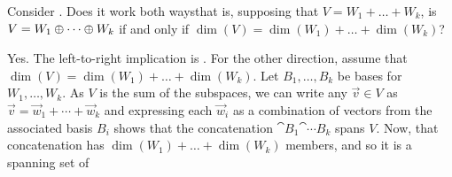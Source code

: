 \begin{exercises}
  \recommended \item 
    Consider .
    Does it work both ways\Dash that is,
    supposing that \( V=W_1+\dots+ W_k \),
    is \( V=W_1\oplus\cdots\oplus W_k \) if and only if
    \( \dim(V)=\dim(W_1)+\dots+\dim(W_k) \)?
    \begin{answer}
      Yes.
      The left-to-right implication is
      .
      For the other direction,
      assume that \( \dim(V)=\dim(W_1)+\dots+\dim(W_k) \).
      Let \( B_1,\dots, B_k \) be bases for \( W_1,\dots, W_k \).
      As $V$ is the sum of the subspaces, we can write 
      any \( \vec{v}\in V \) as
      \( \vec{v}=\vec{w}_1+\cdots+\vec{w}_k \) and expressing each
      \( \vec{w}_i \) as a combination of vectors from the associated
      basis \( B_i \) shows that the concatenation
      \( \cat{B_1}{\cat{\cdots}{B_k}}  \) spans \( V \).
      Now, that concatenation has
      \( \dim(W_1)+\dots+\dim(W_k) \) members, and so it is a spanning set of 

\end{answer}
\end{exercises}
